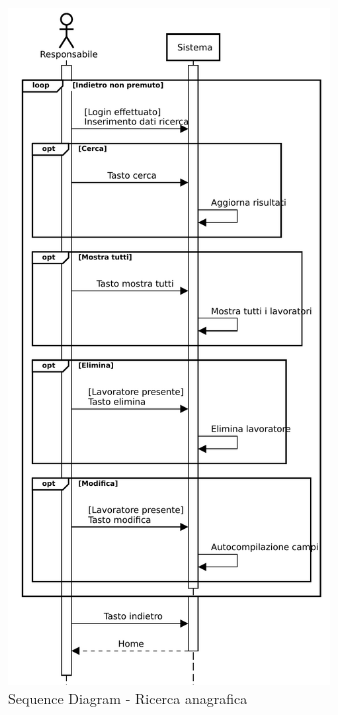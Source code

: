 \documentclass[a4paper,11pt]{article}
\begin{document}
\begin{figure}[htpb]
	\centering
	\includegraphics[width=0.76\textwidth]{diagrams/Sequence_Diagram_-_Ricerca-anagrafica_1.pdf}
	\caption{Sequence Diagram - Ricerca anagrafica}
	\label{fig:seq_dia_ric_anagrafica}
\end{figure}




\newpage
\end{document}
